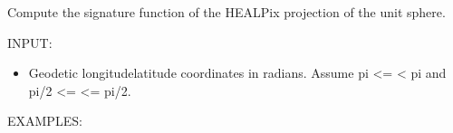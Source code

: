 \documentclass[a4paper,12ptopenany,oneside,english]{sphinxmanual}
\begin{document}
\begin{fulllineitems}
\label{\detokenize{pj_healpix:rhealpixdggs.pj_healpix.healpix_sphere}}
\pysigstartsignatures
{}
\pysigstopsignatures
\sphinxAtStartPar
Compute the signature function of the HEALPix
projection of the unit sphere.

\sphinxAtStartPar
INPUT:
\begin{itemize}
\item {} 
\sphinxAtStartPar
{} \sphinxhyphen{} Geodetic longitude\sphinxhyphen{}latitude coordinates in radians.
Assume \sphinxhyphen{}pi \textless{}=  \textless{} pi and \sphinxhyphen{}pi/2 \textless{}=  \textless{}= pi/2.

\end{itemize}

\sphinxAtStartPar
EXAMPLES:

\begin{sphinxVerbatim}[commandchars=\\\{\}]
    
\end{sphinxVerbatim}

\end{fulllineitems}

\end{document}
